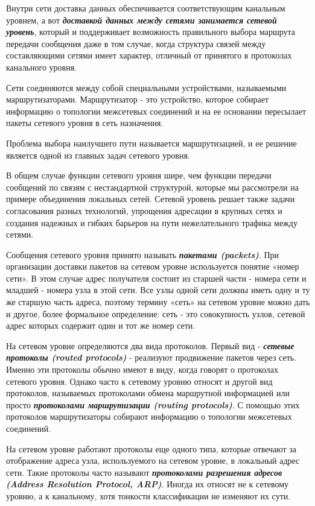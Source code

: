 Внутри сети доставка данных обеспечивается соответствующим канальным уровнем, а вот \textbf{\textit{доставкой данных между сетями занимается сетевой уровень}}, который и поддерживает возможность правильного выбора маршрута передачи сообщения даже в том случае, когда структура связей между составляющими сетями имеет характер, отличный от принятого в протоколах канального уровня.

Сети соединяются между собой специальными устройствами, называемыми маршрутизаторами.
Маршрутизатор - это устройство, которое собирает информацию о топологии межсетевых соединений и на ее основании пересылает пакеты сетевого уровня в сеть назначения.

Проблема выбора наилучшего пути называется маршрутизацией, и ее решение является одной из главных задач сетевого уровня.

В общем случае функции сетевого уровня шире, чем функции передачи сообщений по связям с нестандартной структурой, которые мы рассмотрели на примере объединения локальных сетей.
Сетевой уровень решает также задачи согласования разных технологий, упрощения адресации в крупных сетях и создания надежных и гибких барьеров на пути нежелательного трафика между сетями.

Сообщения сетевого уровня принято называть \textbf{\textit{пакетами (packets)}}.
При организации доставки пакетов на сетевом уровне используется понятие «номер сети».
В этом случае адрес получателя состоит из старшей части - номера сети и младшей - номера узла в этой сети.
Все узлы одной сети должны иметь одну и ту же старшую часть адреса, поэтому термину «сеть» на сетевом уровне можно дать и другое, более формальное определение: сеть - это совокупность узлов, сетевой адрес которых содержит один и тот же номер сети.

На сетевом уровне определяются два вида протоколов.
Первый вид - \textbf{\textit{сетевые протоколы (routed protocols)}} - реализуют продвижение пакетов через сеть.
Именно эти протоколы обычно имеют в виду, когда говорят о протоколах сетевого уровня.
Однако часто к сетевому уровню относят и другой вид протоколов, называемых протоколами обмена маршрутной информацией или просто \textbf{\textit{протоколами маршрутизации (routing protocols)}}.
С помощью этих протоколов маршрутизаторы собирают информацию о топологии межсетевых соединений.

На сетевом уровне работают протоколы еще одного типа, которые отвечают за отображение адреса узла, используемого на сетевом уровне, в локальный адрес сети.
Такие протоколы часто называют \textbf{\textit{протоколами разрешения адресов (Address Resolution Protocol, ARP)}}.
Иногда их относят не к сетевому уровню, а к канальному, хотя тонкости классификации не изменяют их сути.

